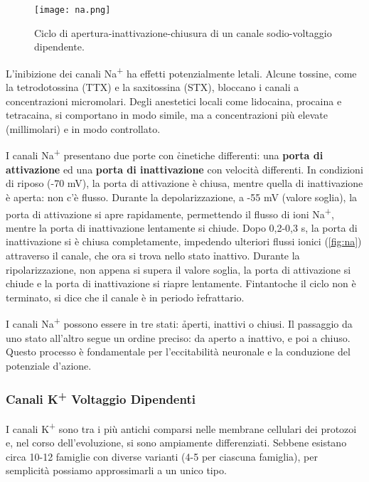 \begin{figure}[h]
    \centering
    \texttt{[image: na.png]}
    \caption{Ciclo di apertura-inattivazione-chiusura di un canale sodio-voltaggio dipendente.}
    \label{fig:na}
\end{figure}

L'\h{inibizione} dei canali Na\textsuperscript{+} ha effetti potenzialmente letali. Alcune tossine, come la tetrodotossina (TTX) e la saxitossina (STX), bloccano i canali a concentrazioni micromolari. Degli anestetici locali come lidocaina, procaina e tetracaina, si comportano in modo simile, ma a concentrazioni più elevate (millimolari) e in modo controllato.

I canali Na\textsuperscript{+} presentano due porte con \h{cinetiche} differenti: una  \textbf{porta di attivazione} ed una \textbf{porta di inattivazione} con velocità differenti. In condizioni di riposo (-70 mV), la porta di attivazione è chiusa, mentre quella di inattivazione è aperta: non c'è flusso. Durante la depolarizzazione, a -55 mV (valore soglia), la porta di attivazione si apre rapidamente, permettendo il flusso di ioni Na\textsuperscript{+}, mentre la porta di inattivazione lentamente si chiude. Dopo 0,2-0,3 s, la porta di inattivazione si è chiusa completamente, impedendo ulteriori flussi ionici (\autoref{fig:na}) attraverso il canale, che ora si trova nello stato \h{inattivo}. Durante la ripolarizzazione, non appena si supera il valore soglia, la porta di attivazione si chiude e la porta di inattivazione si riapre lentamente. Fintantoche il ciclo non è terminato, si dice che il canale è in periodo \h{refrattario}.

I canali Na\textsuperscript{+} possono essere in tre stati: \h{aperti, inattivi o chiusi}. Il passaggio da uno stato all'altro segue un ordine preciso: da aperto a inattivo, e poi a chiuso. Questo processo è fondamentale per l'eccitabilità neuronale e la conduzione del potenziale d'azione.

\subsubsection{Canali K\textsuperscript{+} Voltaggio Dipendenti}
I canali K\textsuperscript{+} sono tra i più antichi comparsi nelle membrane cellulari dei protozoi e, nel corso dell'evoluzione, si sono ampiamente differenziati. Sebbene esistano circa 10-12 famiglie con diverse varianti (4-5 per ciascuna famiglia), per semplicità possiamo approssimarli a un unico tipo.

